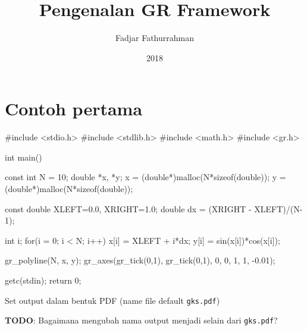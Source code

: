 \documentclass[a4paper,11pt]{extarticle}
\title{
Pengenalan GR Framework
}
\author{Fadjar Fathurrahman}
\date{2018}
\begin{document}
\maketitle

\section{Contoh pertama}
\begin{ccode}
#include <stdio.h>
#include <stdlib.h>
#include <math.h>
#include <gr.h>

int main()
{
  const int N = 10;
  double *x, *y;
  x = (double*)malloc(N*sizeof(double));
  y = (double*)malloc(N*sizeof(double));
  
  const double XLEFT=0.0, XRIGHT=1.0;
  double dx = (XRIGHT - XLEFT)/(N-1);

  int i;
  for(i = 0; i < N; i++) {
    x[i] = XLEFT + i*dx;
    y[i] = sin(x[i])*cos(x[i]);
  }

  gr_polyline(N, x, y);
  gr_axes(gr_tick(0,1), gr_tick(0,1), 0, 0, 1, 1, -0.01);

  getc(stdin);
  return 0;
}
\end{ccode}

Set output dalam bentuk PDF (name file default \texttt{gks.pdf})

\textbf{TODO}: Bagaimana mengubah nama output menjadi selain dari \texttt{gks.pdf}?
\end{document}
